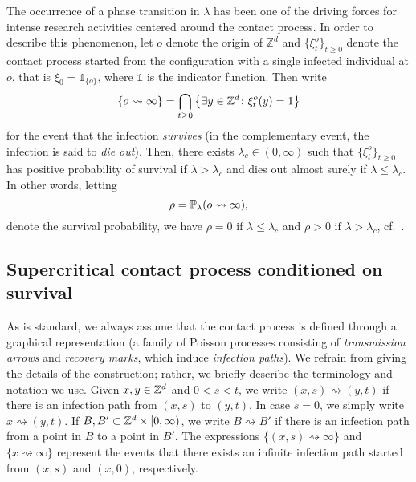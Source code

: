 The occurrence of a phase transition in $\lambda$ has been one of the driving forces for intense research activities centered around the contact process.
In order to describe this phenomenon, let $o$ denote the origin of $\mathbb{Z}^d$ and $\{\xi^o_t\}_{t\ge0}$ denote the contact process started from the configuration with a single infected individual at $o$, that is $\xi_0=\mathds{1}_{\{o\}}$, where $\mathds{1}$ is the indicator function. Then write 
\[ \{o \rightsquigarrow \infty\} = \bigcap_{t\ge0}\big\{\exists y\in\Zd\colon \xi^o_t(y) = 1\big\} \]
for the event that the infection \emph{survives} (in the complementary event, the infection is said to \textit{die out}). 
Then, there exists $\lambda_c\in(0,\infty)$ such that $\{\xi^o_t\}_{t \ge 0}$ has positive probability of survival if $\lambda > \lambda_c$ and dies out almost surely if $\lambda \le \lambda_c$. In other words, letting 
$$\rho = \P_\lambda(o \rightsquigarrow \infty),$$
denote the survival probability, we have 		$\rho	=0\text{ if }\lambda\le\lambda_c$ and $		\rho	>0\text{ if }\lambda>\lambda_c$, cf.\ \cite{Durre91,BezuiGrimm90}. 




\subsection{Supercritical contact process conditioned on survival}
As is standard, we always assume that the contact process is defined through a graphical representation (a family of Poisson processes consisting of \textit{transmission arrows} and \textit{recovery marks}, which induce \textit{infection paths}). We refrain from giving the details of the construction; rather, we briefly describe the terminology and notation we use. Given $x, y \in \Zd$ and $0 < s < t$, we write $(x,s) \rightsquigarrow (y,t)$ if there is an infection path from $(x,s)$ to $(y,t)$. In case $s = 0$, we simply write $x \rightsquigarrow (y,t)$. If $B, B' \subset \Zd \times [0,\infty)$, we write $B \rightsquigarrow B'$ if there is an infection path from a point in $B$ to a point in $B'$. The expressions $\{(x,s) \rightsquigarrow \infty\}$ and $\{x \rightsquigarrow \infty\}$ represent the events that there exists an infinite infection path started from $(x,s)$ and $(x,0)$, respectively.

